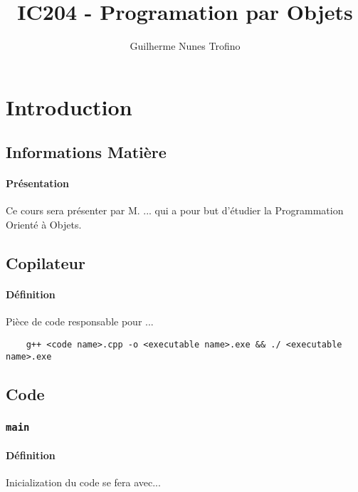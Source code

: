\documentclass{article}
\title{IC204 - Programation par Objets}
\author{Guilherme Nunes Trofino}
\begin{document}
\maketitle

\newpage\tableofcontents

\section{Introduction}



\subsection{Informations Matière}
\paragraph{Présentation}Ce cours sera présenter par M. ... qui a pour but d'étudier la Programmation Orienté à Objets.

\subsection{Copilateur}
\paragraph{Définition}Pièce de code responsable pour ...
\begin{scriptsize}
    \myStyleCPP
    \begin{lstlisting}
    g++ <code name>.cpp -o <executable name>.exe && ./ <executable name>.exe
    \end{lstlisting}
\end{scriptsize}

\subsection{Code}
\subsubsection{\texttt{main}}
\paragraph{Définition}Inicialization du code se fera avec...
\begin{scriptsize}
    \myStyleCPP
    
\end{scriptsize}
\end{document}
